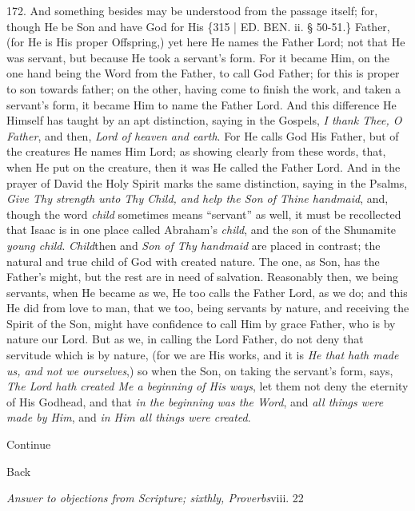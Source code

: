 172. And something besides may
be understood from the passage itself; for, though He be Son and have
God for His \{315 | ED.
BEN. ii. § 50-51.\} Father, (for He is His proper
Offspring,) yet here He names the Father Lord; not that He was
servant, but because He took a servant's form. For it became Him, on
the one hand being the Word from the Father, to call God Father; for
this is proper to son towards father; on the other, having come to
finish the work, and taken a servant's form, it became Him to name the
Father Lord. And this difference He Himself has taught by an apt
distinction, saying in the Gospels, \emph{I thank Thee, O Father}, and
then, \emph{Lord of heaven and earth}. For He calls God His Father,
but of the creatures He names Him Lord; as showing clearly from these
words, that, when He put on the creature, then it was He called the
Father Lord. And in the prayer of David the Holy Spirit marks the same
distinction, saying in the Psalms, \emph{Give Thy strength unto Thy
Child, and help the Son of Thine handmaid}, and, though the word \emph{child}
sometimes means ``servant'' as well, it must be recollected that Isaac
is in one place called Abraham's \emph{child}, and the son of the
Shunamite \emph{young child}. \emph{Child}then and \emph{Son of Thy
handmaid} are placed in contrast; the natural and true child of God
with created nature. The one, as Son, has the Father's might, but the
rest are in need of salvation. Reasonably then, we being servants,
when He became as we, He too calls the Father Lord, as we do; and this
He did from love to man, that we too, being servants by nature, and
receiving the Spirit of the Son, might have confidence to call Him by
grace Father, who is by nature our Lord. But as we, in calling the
Lord Father, do not deny that servitude which is by nature, (for we
are His works, and it is \emph{He that hath made us, and not we ourselves},)
so when the Son, on taking the servant's form, says, \emph{The Lord hath
created Me a beginning of His ways}, let them not deny the eternity
of His Godhead, and that \emph{in the beginning was the Word}, and \emph{all
things were made by Him}, and \emph{in Him all things were created}.

Continue

Back


\emph{Answer
to objections from Scripture; sixthly, Proverbs}viii.
22

